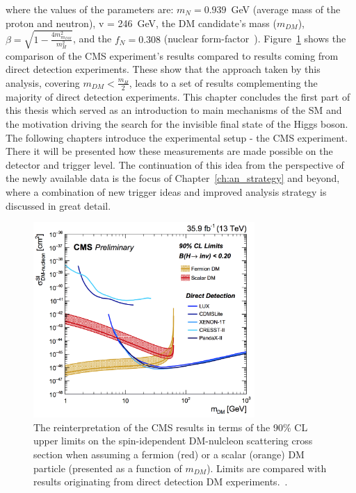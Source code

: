 where the values of the parameters are: $m_N = 0.939$~GeV (average mass of the proton and neutron), v = 246~GeV, the DM candidate's mass ($m_{DM}$), $\beta = \sqrt{1-\frac{4m_{m_{DM}}^2}{m_H^2}}$, and the $f_N=0.308$ (nuclear form-factor~\cite{paper:form_fact, paper:HIG_17_023}). Figure~\ref{fig:dm_2016} shows the comparison of the CMS experiment's results compared to results coming from direct detection experiments. These show that the approach taken by this analysis, covering $m_{DM}<\frac{m_H}{2}$, leads to a set of results complementing the majority of direct detection experiments. %
\newpages
\hspace{10pt} This chapter concludes the first part of this thesis which served as an introduction to main mechanisms of the SM and the motivation driving the search for the invisible final state of the Higgs boson. The following chapters introduce the experimental setup - the CMS experiment. There it will be presented how these measurements are made possible on the detector and trigger level. The continuation of this idea from the perspective of the newly available data is the focus of Chapter~\ref{ch:an_strategy} and beyond, where a combination of new trigger ideas and improved analysis strategy is discussed in great detail.

  \begin{figure}[htbp]
    \begin{center}
        \includegraphics[width=0.75\textwidth]{Theory/DM2016.png}
        \caption{The reinterpretation of the CMS results in terms of the 90\% CL upper limits on the spin-idependent DM-nulcleon scattering cross section when assuming a fermion (red) or a scalar (orange) DM particle (presented as a function of $m_{DM}$). Limits are compared with results originating from direct detection DM experiments.~\cite{paper:HIG_17_023}.}
      \label{fig:dm_2016}
    \end{center}
  \end{figure}
